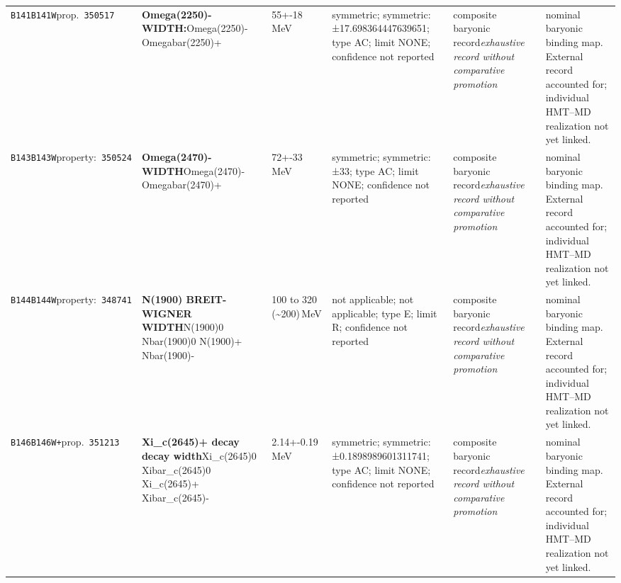 \begin{landscape}
\begin{longtable}{L{1.85cm}L{4.45cm}L{2.35cm}L{4.05cm}L{3.35cm}L{7.15cm}}
\texttt{B141}\newline \texttt{B141W}\newline prop.\ \texttt{350517} & \textbf{Omega(2250)- WIDTH:}\newline Omega(2250)- \textbar{}\allowbreak{} Omegabar(2250)+ & 55+-18\,MeV & symmetric; symmetric: ±17.698364447639651; type AC; limit NONE; confidence not reported & composite baryonic record\newline \emph{exhaustive record without comparative promotion} & nominal baryonic binding map. External record accounted for; individual HMT--MD realization not yet linked. \\
\texttt{B143}\newline \texttt{B143W}\newline property:\ \texttt{350524} & \textbf{Omega(2470)- WIDTH}\newline Omega(2470)- \textbar{}\allowbreak{} Omegabar(2470)+ & 72+-33\,MeV & symmetric; symmetric: ±33; type AC; limit NONE; confidence not reported & composite baryonic record\newline \emph{exhaustive record without comparative promotion} & nominal baryonic binding map. External record accounted for; individual HMT--MD realization not yet linked. \\
\texttt{B144}\newline \texttt{B144W}\newline property:\ \texttt{348741} & \textbf{N(1900) BREIT-WIGNER WIDTH}\newline N(1900)0 \textbar{}\allowbreak{} Nbar(1900)0 \textbar{}\allowbreak{} N(1900)+ \textbar{}\allowbreak{} Nbar(1900)- & 100 to 320 (\textasciitilde{}200)\,MeV & not applicable; not applicable; type E; limit R; confidence not reported & composite baryonic record\newline \emph{exhaustive record without comparative promotion} & nominal baryonic binding map. External record accounted for; individual HMT--MD realization not yet linked. \\
\texttt{B146}\newline \texttt{B146W+}\newline prop.\ \texttt{351213} & \textbf{Xi\_\allowbreak{}c(2645)+ decay decay width}\newline Xi\_\allowbreak{}c(2645)0 \textbar{}\allowbreak{} Xibar\_\allowbreak{}c(2645)0 \textbar{}\allowbreak{} Xi\_\allowbreak{}c(2645)+ \textbar{}\allowbreak{} Xibar\_\allowbreak{}c(2645)- & 2.14+-0.19\,MeV & symmetric; symmetric: ±0.1898989601311741; type AC; limit NONE; confidence not reported & composite baryonic record\newline \emph{exhaustive record without comparative promotion} & nominal baryonic binding map. External record accounted for; individual HMT--MD realization not yet linked. \\

\end{longtable}
\end{landscape}
